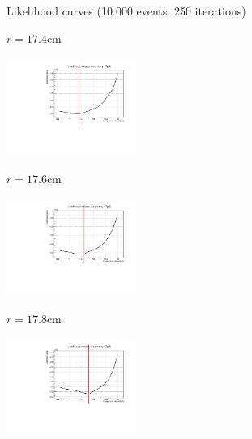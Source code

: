 \documentclass[8 pt]{beamer}
\begin{document}
\begin{frame}{Likelihood curves (10.000 events, 250 iterations)}
\vspace{-5pt}
\begin{minipage}[c]{.32\textwidth}
\begin{exampleblock}{} \begin{center}$r = 17.4$cm\end{center} \end{exampleblock}
\includegraphics[width=4.2cm, height=3.2cm]{figs/likelihood250LowStat/likelihood17p4.pdf} 
\end{minipage}
\begin{minipage}[c]{.32\textwidth}
\begin{exampleblock}{} \begin{center}$r = 17.6$cm\end{center} \end{exampleblock}
\includegraphics[width=4.2cm, height=3.2cm]{figs/likelihood250LowStat/likelihood17p6.pdf} 
\end{minipage}
\begin{minipage}[c]{.32\textwidth}
\begin{exampleblock}{} \begin{center}$r = 17.8$cm\end{center} \end{exampleblock}
\includegraphics[width=4.2cm, height=3.2cm]{figs/likelihood250LowStat/likelihood17p8.pdf} 
\end{minipage}
\end{frame}
\end{document}
